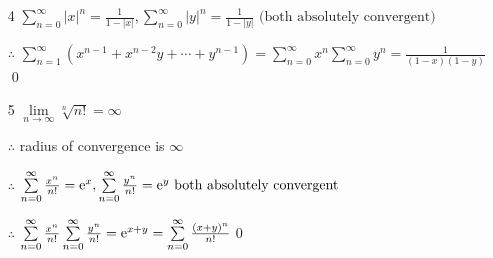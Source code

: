 \begin{enumerate}[1]
        \item[4]
        $\sum\limits_{n=0}^\infty |x|^n =\frac{1}{1-|x|},\sum\limits_{n=0}^\infty |y|^n =\frac{1}{1-|y|}\text{ (both absolutely convergent)}$
        \par $\therefore$ $\sum\limits_{n=1}^\infty (x^{n-1}+x^{n-2}y+ \cdots +y^{n-1})=\sum\limits_{n=0}^\infty x^n\sum\limits_{n=0}^\infty y^n=\frac{1}{(1-x)(1-y)}$\qed

        \item[5]
        $\lim\limits_{n\rightarrow{\infty}}\sqrt[n]{n!}=\infty$
        \par $\therefore$ radius of convergence is $\infty$
        \par $\therefore$ $\sum\limits_{n=0}^\infty \frac{x^n}{n!}=\mathrm{e}^x,\sum\limits_{n=0}^\infty \frac{y^n}{n!}=\mathrm{e}^y \text{ both absolutely convergent}$
        \par $\therefore$ $\sum\limits_{n=0}^\infty \frac{x^n}{n!}\sum\limits_{n=0}^\infty \frac{y^n}{n!}=\mathrm{e} ^{x+y}=\sum\limits_{n=0}^\infty \frac{(x+y)^n}{n!}$\qed
    \end{enumerate}

